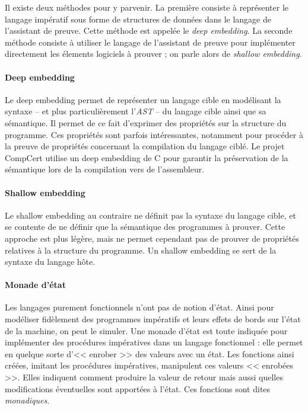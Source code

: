 			Il existe deux méthodes pour y parvenir. La première consiste à représenter le langage impératif sous forme de structures de données dans le langage de l'assistant de preuve. Cette méthode est appelée le \emph{deep embedding}. La seconde méthode consiste à utiliser le langage de l'assistant de preuve pour implémenter directement les élements logiciels à prouver ; on parle alors de \emph{shallow embedding}.

				\paragraph{Deep embedding} Le deep embedding permet de représenter un langage cible en modélisant la syntaxe -- et plus particulièrement l'\emph{AST} -- du langage cible ainsi que sa sémantique. Il permet de ce fait d'exprimer des propriétés sur la structure du programme. Ces propriétés sont parfois intéressantes, notamment pour procéder à la preuve de propriétés concernant la compilation du langage ciblé. Le projet CompCert utilise un deep embedding de C pour garantir la préservation de la sémantique lors de la compilation vers de l'assembleur.
				\paragraph{Shallow embedding} Le shallow embedding au contraire ne définit pas la syntaxe du langage cible, et se contente de ne définir que la sémantique des programmes à prouver. Cette approche est plus légère, mais ne permet cependant pas de prouver de propriétés relatives à la structure du programme. Un shallow embedding se sert de la syntaxe du langage hôte.

				\label{monad}
				\paragraph{Monade d'état} Les langages purement fonctionnels n'ont pas de notion d'état. Ainsi pour modéliser fidèlement des programmes impératifs et leurs effets de bords sur l'état de la machine, on peut le simuler. Une monade d'état est toute indiquée pour implémenter des procédures impératives dans un langage fonctionnel : elle permet en quelque sorte d'<< enrober >> des valeurs avec un état. Les fonctions ainsi créées, imitant les procédures impératives, manipulent ces valeurs << enrobées >>. Elles indiquent comment produire la valeur de retour mais aussi quelles modifications éventuelles sont apportées à l'état. Ces fonctions sont dites \emph{monadiques}. 

